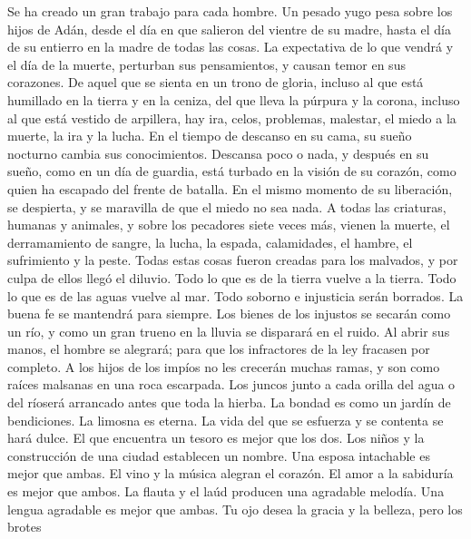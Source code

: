  Se ha creado un gran trabajo para cada hombre. Un pesado
yugo pesa sobre los hijos de Adán, desde el día en que salieron del
vientre de su madre, hasta el día de su entierro en la madre de todas
las cosas.  La expectativa de lo que vendrá y el día de la
muerte, perturban sus pensamientos, y causan temor en sus corazones.
 De aquel que se sienta en un trono de gloria, incluso al
que está humillado en la tierra y en la ceniza,  del que
lleva la púrpura y la corona, incluso al que está vestido de arpillera,
 hay ira, celos, problemas, malestar, el miedo a la
muerte, la ira y la lucha. En el tiempo de descanso en su cama, su sueño
nocturno cambia sus conocimientos.  Descansa poco o nada,
y después en su sueño, como en un día de guardia, está turbado en la
visión de su corazón, como quien ha escapado del frente de batalla.
 En el mismo momento de su liberación, se despierta, y se
maravilla de que el miedo no sea nada.  A todas las
criaturas, humanas y animales, y sobre los pecadores siete veces más,
 vienen la muerte, el derramamiento de sangre, la lucha,
la espada, calamidades, el hambre, el sufrimiento y la peste.
 Todas estas cosas fueron creadas para los malvados, y
por culpa de ellos llegó el diluvio.  Todo lo que es de
la tierra vuelve a la tierra. Todo lo que es de las aguas vuelve al mar.
 Todo soborno e injusticia serán borrados. La buena fe se
mantendrá para siempre.  Los bienes de los injustos se
secarán como un río, y como un gran trueno en la lluvia se disparará en
el ruido.  Al abrir sus manos, el hombre se alegrará;
para que los infractores de la ley fracasen por completo.
 A los hijos de los impíos no les crecerán muchas ramas,
y son como raíces malsanas en una roca escarpada.  Los
juncos junto a cada orilla del agua o del ríoserá arrancado antes que
toda la hierba.  La bondad es como un jardín de
bendiciones. La limosna es eterna.  La vida del que se
esfuerza y se contenta se hará dulce. El que encuentra un tesoro es
mejor que los dos.  Los niños y la construcción de una
ciudad establecen un nombre. Una esposa intachable es mejor que ambas.
 El vino y la música alegran el corazón. El amor a la
sabiduría es mejor que ambos.  La flauta y el laúd
producen una agradable melodía. Una lengua agradable es mejor que ambas.
 Tu ojo desea la gracia y la belleza, pero los brotes
